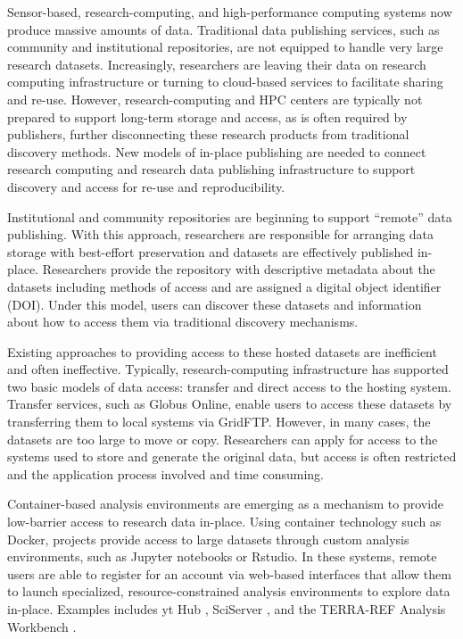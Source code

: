 \documentclass{sig-alternate}
\begin{document}
Sensor-based, research-computing, and high-performance computing systems now produce massive amounts of data.  Traditional data publishing services, such as community and institutional repositories, are not equipped to handle very large research datasets.  Increasingly, researchers are leaving their data on research computing infrastructure or turning to cloud-based services to facilitate sharing and re-use. However, research-computing and HPC centers are typically not prepared to support long-term storage and access, as is often required by publishers, further disconnecting these research products from traditional discovery methods. New models of in-place publishing are needed to connect research computing and research data publishing infrastructure to support discovery and access for re-use and reproducibility.

Institutional and community repositories are beginning to support ``remote'' data publishing.  With this approach, researchers are responsible for arranging data storage with best-effort preservation and datasets are effectively published in-place. Researchers provide the repository with descriptive metadata about the datasets including methods of access and are assigned a digital object identifier (DOI).  Under this model, users can discover these datasets and information about how to access them via traditional discovery mechanisms. 

Existing approaches to providing access to these hosted datasets are inefficient and often ineffective.  Typically, research-computing infrastructure has supported two basic models of data access: transfer and direct access to the hosting system.  Transfer services, such as Globus Online, enable users to access these datasets by transferring them to local systems via GridFTP.  However, in many cases, the datasets are too large to move or copy. Researchers can apply for access to the systems used to store and generate the original data, but access is often restricted and the application process involved and time consuming.

Container-based analysis environments are emerging as a mechanism to provide low-barrier access to research data in-place.  Using container technology such as Docker, projects provide access to large datasets through custom analysis environments, such as Jupyter notebooks or Rstudio.  In these systems, remote users are able to register for an account via web-based interfaces that allow them to launch specialized, resource-constrained analysis environments to explore data in-place. Examples includes yt Hub \cite{smith2011}, SciServer \cite{Medvedev:2016:SCB:2949689.2949700}, and the TERRA-REF Analysis Workbench \cite{willis_craig_2017_580057}.
\end{document}
